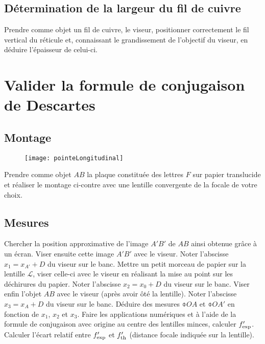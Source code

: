 \documentclass[a4paper, 12pt, final, garamond]{book}
\begin{document}
\subsection{Détermination de la largeur du fil de cuivre}

Prendre comme objet un fil de cuivre, le viseur, positionner correctement le fil
vertical du réticule et, connaissant le grandissement de l'objectif du viseur,
en déduire l'épaisseur de celui-ci.

%

\section{Valider la formule de conjugaison de Descartes}

\subsection{Montage}

\begin{wrapfigure}[4]{r}{0.62\textwidth} 
    \vspace*{-40pt}
    \begin{center}
        \texttt{[image: pointeLongitudinal]}
    \end{center}
\end{wrapfigure} 

Prendre comme objet $AB$ la plaque constituée des lettres $F$ sur papier
translucide et réaliser le montage ci-contre avec une lentille convergente de la
focale de votre choix.

\subsection{Mesures}

 Chercher la position approximative de l'image $A'B'$ de $AB$ ainsi obtenue
 grâce à un écran. Viser ensuite cette image $A'B'$ avec le viseur. Noter
 l'abscisse $x_1 = x_{A'} + D$ du viseur sur le banc. Mettre un petit morceau de
 papier sur la lentille $\mathcal{L}$, viser celle-ci avec le viseur en
 réalisant la mise au point sur les déchirures du papier. Noter l'abscisse $x_2
 = x_0 + D$ du viseur sur le banc. Viser enfin l'objet $AB$ avec le viseur
 (après avoir ôté la lentille). Noter l'abscisse $x_3 = x_{A} + D$ du viseur sur
 le banc. Déduire des mesures $\obar{OA}$ et $\obar{OA'}$ en fonction de $x_1$,
 $x_2$ et $x_3$. Faire les applications numériques et à l'aide de la formule de
 conjugaison avec origine au centre des lentilles minces, calculer  $f_{\rm
 exp}'$. Calculer l'écart relatif entre $f_{\rm exp}'$ et $f_{\rm th}'$
 (distance focale indiquée sur la lentille).
\end{document}
